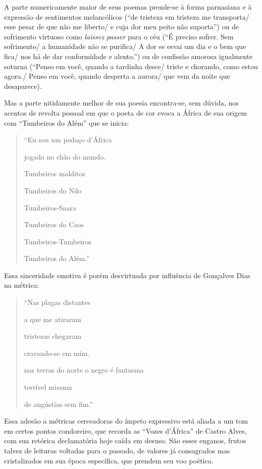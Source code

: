 \documentclass[
  letterpaper,
  DIV=11,
  numbers=noendperiod]{scrreprt}
\begin{document}
A parte numericamente maior de seus poemas prende-se à forma parnasiana
e à expressão de sentimentos melancólicos (``de tristeza em tristeza me
transporta/ esse pesar de que não me liberto/ e cuja dor meu peito não
suporta'') ou de sofrimento virtuoso como \emph{laissez passer} para o
céu (``É preciso sofrer. Sem sofrimento/ a humanidade não se purifica/ A
dor se esvai um dia e o bem que fica/ nos há de dar conformidade e
alento.'') ou de confissão amorosa igualmente soturna (``Penso em você,
quando a tardinha desce/ triste e chorando, como estou agora./ Penso em
você, quando desperta a aurora/ que vem da noite que desaparece).

Mas a parte nitidamente melhor de sua poesia encontra-se, sem dúvida,
nos acentos de revolta pessoal em que o poeta de cor evoca a África de
sua origem com ``Tumbeiros do Além'' que se inicia:

\begin{quote}
``Eu sou um pedaço d'África~

jogado no chão do mundo.~

Tumbeiros malditos~

Tumbeiros do Nilo~

Tumbeiros-Saara~

Tumbeiros do Caos~

Tumbeiros-Tumbeiros~

Tumbeiros do Além.''
\end{quote}

Essa sinceridade emotiva é porém desvirtuada por influência de Gonçalves
Dias na métrica:

\begin{quote}
``Nas plagas distantes~

a que me atiraram~

tristezas chegaram~

cravando-se em mim.~

nas terras do norte o negro é fantasma~

terrível miasma~

de angústias sem fim.''
\end{quote}

Essa adesão a métricas cerceadoras do ímpeto expressivo está aliada a um
tom em certos pontos condoreiro, que recorda as ``Vozes d'África'' de
Castro Alves, com sua retórica declamatória hoje caída em desuso. São
esses enganos, frutos talvez de leituras voltadas para o passado, de
valores já consagrados mas cristalizados em sua época específica, que
prendem seu voo poético.
\end{document}
